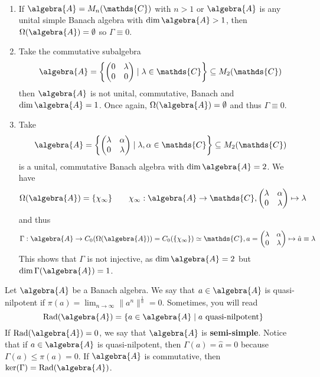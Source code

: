 \documentclass[a4paper]{article}
\begin{document}
\begin{example}~
	\begin{enumerate}
		\item If $\algebra{A} = M_n(\mathds{C})$ with $n > 1$ or $\algebra{A}$ is any unital simple Banach algebra with $\dim \algebra{A} > 1$, then $\Omega(\algebra{A}) = \emptyset$ so $\Gamma \equiv 0$.
		\item Take the commutative subalgebra
		\begin{equation*}
			\algebra{A} = \left\{ \qmatrix{0 & \lambda \\ 0 & 0} \mid \lambda \in \mathds{C} \right\} \subseteq M_2(\mathds{C})
		\end{equation*} 
		then $\algebra{A}$ is not unital, commutative, Banach and $\dim \algebra{A} = 1$. Once again, $\Omega(\algebra{A}) = \emptyset$ and thus $\Gamma \equiv 0$. 
		\item Take
		\begin{equation*}
			\algebra{A} = \left\{ \qmatrix{\lambda & \alpha \\ 0 & \lambda} \mid \lambda, \alpha \in \mathds{C} \right\} \subseteq M_2(\mathds{C})
		\end{equation*}
		is a unital, commutative Banach algebra with $\dim \algebra{A} = 2$. We have
		\begin{equation*}
			\Omega(\algebra{A}) = \{\chi_\infty\} \qquad \chi_\infty: \algebra{A} \to \mathds{C},  \qmatrix{\lambda & \alpha \\ 0 & \lambda}  \mapsto \lambda
		\end{equation*}
		and thus
		\begin{equation*}
			\Gamma: \algebra{A} \to C_0(\Omega(\algebra{A})) = C_0(\{\chi_\infty\}) \simeq \mathds{C}, a = \qmatrix{\lambda & \alpha \\ 0 & \lambda} \mapsto \hat a \equiv \lambda
		\end{equation*}
		This shows that $\Gamma$ is not injective, as $\dim \algebra{A} = 2$ but $\dim \Gamma(\algebra{A}) = 1$.
	\end{enumerate}
\end{example}

\begin{definition}
	Let $\algebra{A}$ be a Banach algebra. We say that $a \in \algebra{A}$ is quasi-nilpotent if $\pi(a) = \lim_{n \to \infty} \|a^n\|^{\frac{1}{n}} = 0$.
	Sometimes, you will read
	\begin{equation*}
		\mathrm{Rad}(\algebra{A})  = \{a \in \algebra{A} \mid a \text{ quasi-nilpotent}\}
	\end{equation*}
	If $\mathrm{Rad}(\algebra{A}) = 0$, we say that $\algebra{A}$ is \textbf{semi-simple}.
	Notice that if $a \in \algebra{A}$ is quasi-nilpotent, then $\Gamma(a) = \hat a = 0$ because $\Gamma(a) \leq \pi(a) = 0$.
	If $\algebra{A}$ is commutative, then $\ker(\Gamma) = \mathrm{Rad}(\algebra{A})$.
\end{definition}
\end{document}

